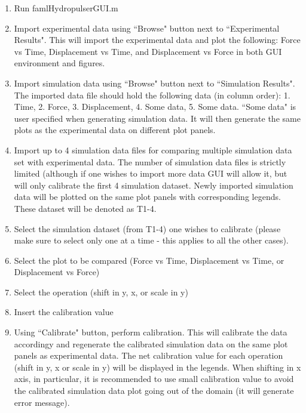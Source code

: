\documentclass[12pt]{article}
\begin{document}
    \begin{enumerate}
        \item   Run faml\textunderscore Hydropulser\textunderscore GUI.m

        \item   Import experimental data using ``Browse" button next to ``Experimental Results". This will import
    the experimental data and plot the following: Force vs Time, Displacement vs
    Time, and Displacement vs Force in both GUI environment and figures.
        
        \item   Import simulation data using ``Browse" button next to ``Simulation
    Results". The imported data file should hold the following data (in column order): 1.
    Time, 2. Force, 3. Displacement, 4. Some data, 5. Some data. ``Some data" is
    user specified when generating simulation data. It will then generate the same
    plots as the experimental data on different plot panels. 

        \item   Import up to 4 simulation data files for comparing multiple
    simulation data set with experimental data. The number of simulation data files
    is strictly limited (although if one wishes to import more data GUI will allow
    it, but will only calibrate the first 4 simulation dataset. Newly imported
    simulation data will be plotted on the same plot panels with corresponding
    legends. These dataset will be denoted as T1-4.

        \item   Select the simulation dataset (from T1-4) one wishes to calibrate (please make sure to select only one at a time - this applies to all the other cases). 

        \item   Select the plot to be compared (Force vs Time, Displacement vs Time, or Displacement vs Force) 

        \item   Select the operation (shift in y, x, or scale in y)

        \item   Insert the calibration value

        \item   Using ``Calibrate" button, perform calibration. This will calibrate
    the data accordingy and regenerate the calibrated simulation data on the same
    plot panels as experimental data. The net calibration value for each operation
    (shift in y, x or scale in y) will be displayed in the legends. When shifting
    in x axis, in particular, it is recommended to use small calibration value to
    avoid the calibrated simulation data plot going out of the domain (it will
    generate error message).


\end{enumerate}
\end{document}
